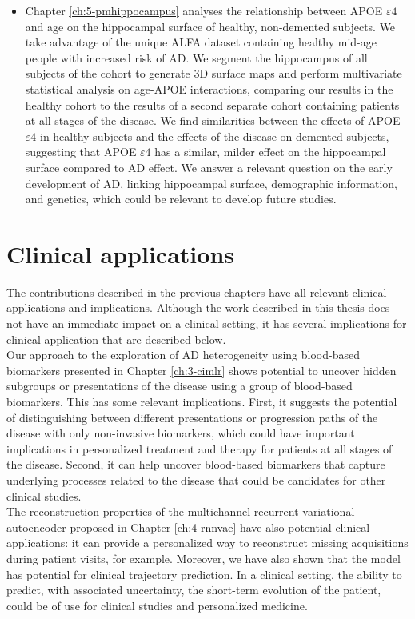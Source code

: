 \begin{itemize}
\item Chapter \ref{ch:5-pmhippocampus} analyses the relationship between APOE $\varepsilon4$ and age on the hippocampal surface of healthy, non-demented subjects. We take advantage of the unique ALFA dataset containing healthy mid-age people with increased risk of AD. We segment the hippocampus of all subjects of the cohort to generate 3D surface maps and perform multivariate statistical analysis on age-APOE interactions, comparing our results in the healthy cohort to the results of a second separate cohort containing patients at all stages of the disease. We find similarities between the effects of APOE $\varepsilon4$ in healthy subjects and the effects of the disease on demented subjects, suggesting that APOE $\varepsilon4$ has a similar, milder effect on the hippocampal surface compared to AD effect. We answer a relevant question on the early development of AD, linking hippocampal surface, demographic information, and genetics, which could be relevant to develop future studies.
\end{itemize}

\section{Clinical applications}
The contributions described in the previous chapters have all relevant clinical applications and implications. Although the work described in this thesis does not have an immediate impact on a clinical setting, it has several implications for clinical application that are described below. \\

Our approach to the exploration of AD heterogeneity using blood-based biomarkers presented in Chapter \ref{ch:3-cimlr} shows potential to uncover hidden subgroups or presentations of the disease using a group of blood-based biomarkers. This has some relevant implications. First, it suggests the potential of distinguishing between different presentations or progression paths of the disease with only non-invasive biomarkers, which could have important implications in personalized treatment and therapy for patients at all stages of the disease. Second, it can help uncover blood-based biomarkers that capture underlying processes related to the disease that could be candidates for other clinical studies. \\

The reconstruction properties of the multichannel recurrent variational autoencoder proposed in Chapter \ref{ch:4-rnnvae} have also potential clinical applications: it can provide a personalized way to reconstruct missing acquisitions during patient visits, for example. Moreover, we have also shown that the model has potential for clinical trajectory prediction. In a clinical setting, the ability to predict, with associated uncertainty, the short-term evolution of the patient, could be of use for clinical studies and personalized medicine. \\

